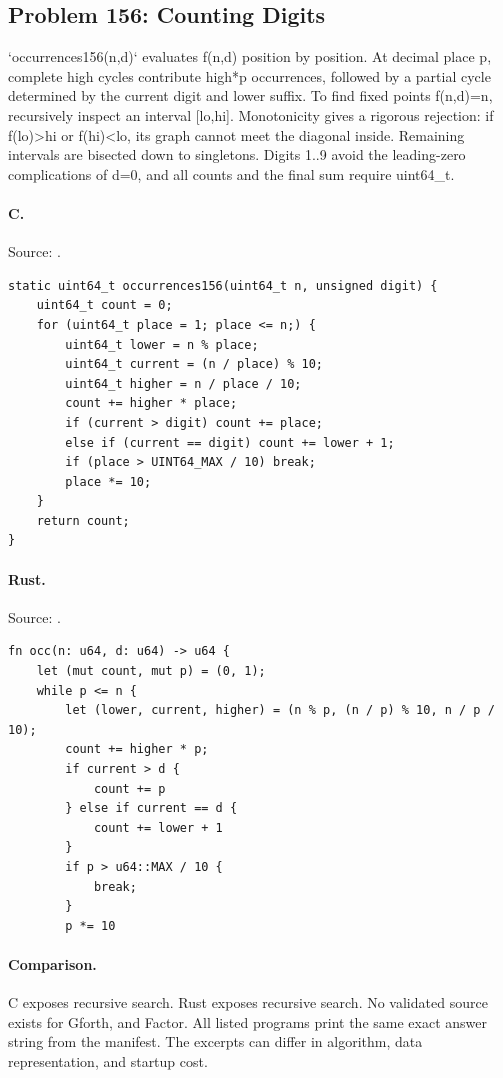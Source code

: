 \subsection{Problem 156: Counting Digits}
\label{walkthrough:p156}
`occurrences156(n,d)` evaluates f(n,d) position by position. At decimal place p, complete high cycles contribute high*p occurrences, followed by a partial cycle determined by the current digit and lower suffix. To find fixed points f(n,d)=n, recursively inspect an interval [lo,hi]. Monotonicity gives a rigorous rejection: if f(lo)>hi or f(hi)<lo, its graph cannot meet the diagonal inside. Remaining intervals are bisected down to singletons. Digits 1..9 avoid the leading-zero complications of d=0, and all counts and the final sum require uint64\_t.

\paragraph{C.} Source: .
\begin{lstlisting}
static uint64_t occurrences156(uint64_t n, unsigned digit) {
    uint64_t count = 0;
    for (uint64_t place = 1; place <= n;) {
        uint64_t lower = n % place;
        uint64_t current = (n / place) % 10;
        uint64_t higher = n / place / 10;
        count += higher * place;
        if (current > digit) count += place;
        else if (current == digit) count += lower + 1;
        if (place > UINT64_MAX / 10) break;
        place *= 10;
    }
    return count;
}
\end{lstlisting}

\paragraph{Rust.} Source: .
\begin{lstlisting}
fn occ(n: u64, d: u64) -> u64 {
    let (mut count, mut p) = (0, 1);
    while p <= n {
        let (lower, current, higher) = (n % p, (n / p) % 10, n / p / 10);
        count += higher * p;
        if current > d {
            count += p
        } else if current == d {
            count += lower + 1
        }
        if p > u64::MAX / 10 {
            break;
        }
        p *= 10
\end{lstlisting}

\paragraph{Comparison.}
C exposes recursive search. Rust exposes recursive search.
No validated source exists for Gforth, and Factor.
All listed programs print the same exact answer string from the manifest. The excerpts can differ in algorithm, data representation, and startup cost.

